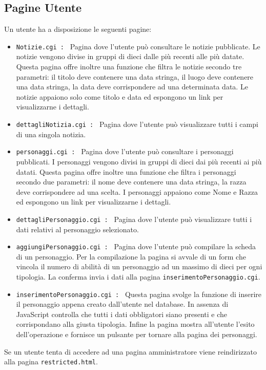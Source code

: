\documentclass{article}
\begin{document}
	\subsection{Pagine Utente}
		Un utente ha a disposizione le seguenti pagine:
		\begin{itemize}
			\item \texttt{Notizie.cgi : } Pagina dove l'utente può consultare le notizie pubblicate.
				Le notizie vengono divise in gruppi di dieci dalle più recenti alle più datate.
				Questa pagina offre inoltre una funzione che filtra le notizie secondo tre parametri:
				il titolo deve contenere una data stringa,
				il luogo deve contenere una data stringa,
				la data deve corrispondere ad una determinata data.
				Le notizie appaiono solo come titolo e data ed espongono un link per visualizzarne i dettagli.
				
			\item \texttt{dettagliNotizia.cgi : } Pagina dove l'utente può visualizzare tutti i campi di una singola notizia.
			\item \texttt{personaggi.cgi : } Pagina dove l'utente può consultare i personaggi pubblicati.
				I personaggi vengono divisi in gruppi di dieci dai più recenti ai più datati.
				Questa pagina offre inoltre una funzione che filtra i personaggi secondo due parametri:
				il nome deve contenere una data stringa,
				la razza deve corrispondere ad una scelta.
				I personaggi appaiono come Nome e Razza ed espongono un link per visualizzarne i dettagli. 
			\item \texttt{dettagliPersonaggio.cgi : } Pagina dove l'utente può visualizzare tutti i dati relativi al personaggio selezionato.
			\item \texttt{aggiungiPersonaggio.cgi : } Pagina dove l'utente può compilare la scheda di un personaggio.
				Per la compilazione la pagina si avvale di un form che vincola il numero di abilità di un personaggio ad un
				massimo di dieci per ogni tipologia. La conferma invia i dati alla pagina \texttt{inserimentoPersonaggio.cgi}.
			\item \texttt{inserimentoPersonaggio.cgi : } Questa pagina svolge la funzione di inserire il personaggio appena
				creato dall'utente nel database. In assenza di JavaScript controlla che tutti i dati obbligatori siano presenti 
				e che corrispondano alla giusta tipologia. Infine la pagina mostra all'utente l'esito dell'operazione e fornisce 
				un pulsante per tornare alla pagina dei personaggi.
		\end{itemize}
		Se un utente tenta di accedere ad una pagina amministratore viene reindirizzato alla pagina \texttt{restricted.html}.
\end{document}
